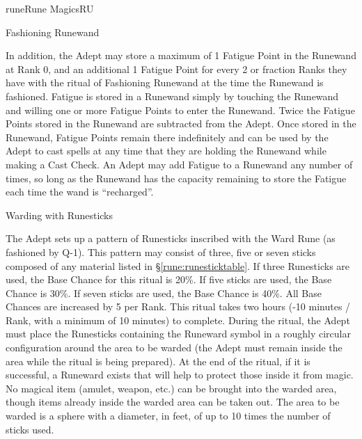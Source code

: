 \begin{college}[1.1]{rune}{Rune Magics}{RU}
\begin{ritual}[Q-2]{Fashioning Runewand}
\begin{effects}
In addition, the Adept may store a maximum of 1 Fatigue Point in the
Runewand at Rank 0, and an additional 1 Fatigue Point for every 2 or
fraction Ranks they have with the ritual of Fashioning Runewand at the
time the Runewand is fashioned.  Fatigue is stored in a Runewand
simply by touching the Runewand and willing one or more Fatigue Points
to enter the Runewand.  Twice the Fatigue Points stored in the
Runewand are subtracted from the Adept.  Once stored in the Runewand,
Fatigue Points remain there indefinitely and can be used by the Adept
to cast spells at any time that they are holding the Runewand while
making a Cast Check.  An Adept may add Fatigue to a Runewand any
number of times, so long as the Runewand has the capacity remaining to
store the Fatigue each time the wand is ``recharged''.
\end{effects}
\end{ritual}

\begin{ritual}[Q-3]{Warding with Runesticks}
\begin{effects}
The Adept sets up a pattern of Runesticks inscribed with the Ward Rune
(as fashioned by Q-1).  This pattern may consist of three, five or
seven sticks composed of any material listed in
\S\ref{rune:runesticktable}.  If three Runesticks are used, the Base
Chance for this ritual is 20\%.  If five sticks are used, the Base
Chance is 30\%.  If seven sticks are used, the Base Chance is 40\%.
All Base Chances are increased by 5 per Rank.  This ritual takes two
hours (-10 minutes / Rank, with a minimum of 10 minutes) to complete.
During the ritual, the Adept must place the Runesticks containing the
Runeward symbol in a roughly circular configuration around the area to
be warded (the Adept must remain inside the area while the ritual is
being prepared).  At the end of the ritual, if it is successful, a
Runeward exists that will help to protect those inside it from magic.
No magical item (amulet, weapon, etc.)  can be brought into the warded
area, though items already inside the warded area can be taken out.
The area to be warded is a sphere with a diameter, in feet, of up to
10 times the number of sticks used.


\end{effects}
\end{ritual}
\end{college}

